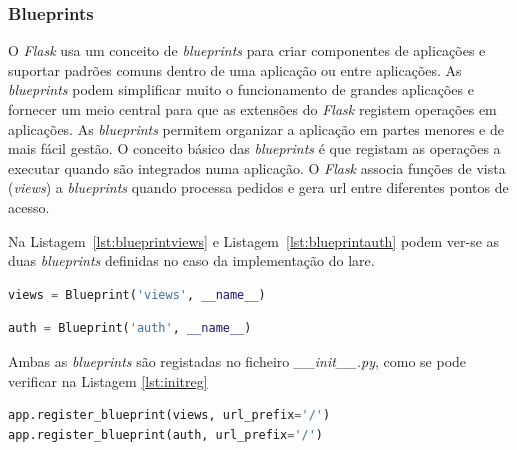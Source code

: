 \subsubsection{Blueprints}
O \textit{Flask} usa um conceito de \textit{blueprints} para criar componentes de aplicações e suportar padrões comuns dentro de uma aplicação ou entre aplicações. As \textit{blueprints} podem simplificar muito o funcionamento de grandes aplicações e fornecer um meio central para que as extensões do \textit{Flask} registem operações em aplicações. As \textit{blueprints} permitem organizar a aplicação em partes menores e de mais fácil gestão. O conceito básico das \textit{blueprints} é que registam as operações a executar quando são integrados numa aplicação. O \textit{Flask} associa funções de vista (\textit{views}) a \textit{blueprints} quando processa pedidos e gera \acrshort{url} entre diferentes pontos de acesso.

Na Listagem~\ref{lst:blueprintviews} e Listagem~\ref{lst:blueprintauth} podem ver-se as duas \textit{blueprints} definidas no caso da implementação do \acrshort{lare}.
\begin{center}
	\begin{minipage}{0.7\linewidth}
		\begin{lstlisting}[language=Python, caption=\textit{Blueprint views} - \textit{views.py}, label=lst:blueprintviews]
views = Blueprint('views', __name__)
\end{lstlisting}
	\end{minipage}
\end{center}

\begin{center}
	\begin{minipage}{0.7\linewidth}
		\begin{lstlisting}[language=Python, caption=\textit{Blueprint auth} - \textit{auth.py}, label=lst:blueprintauth]
auth = Blueprint('auth', __name__)
\end{lstlisting}
	\end{minipage}
\end{center}

Ambas as \textit{blueprints} são registadas no ficheiro \textit{\_\_init\_\_.py}, como se pode verificar na Listagem \ref{lst:initreg}

\begin{center}
	\begin{minipage}{0.7\linewidth}
		\begin{lstlisting}[language=Python, caption=Registo das \textit{blueprints} - \textit{\_\_init\_\_.py}, label=lst:initreg]
app.register_blueprint(views, url_prefix='/')
app.register_blueprint(auth, url_prefix='/')
\end{lstlisting}
	\end{minipage}
\end{center}

